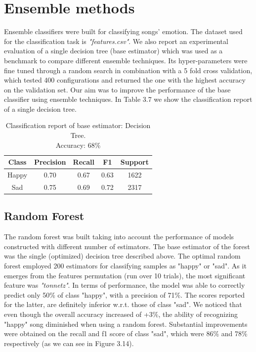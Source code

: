 

\section{Ensemble methods}
Ensemble classifiers were built for classifying songs' emotion. The dataset used for the classification task is \textit{"features.csv"}. 
We also report an experimental evaluation of a single decision tree (base estimator) which was used as a benchmark to compare different ensemble techniques. Its hyper-parameters were fine tuned through a random search in combination with a 5 fold cross validation, which tested 400 configurations and returned the one with the highest accuracy on the validation set. Our aim was to improve the performance of the base classifier using ensemble techniques. In Table 3.7 we show the classification report of a single decision tree. 
 
\begin{table}[!htb]
\centering
\begin{tabular}{ccccc}
\hline
\textbf{Class} & \textbf{Precision} & \textbf{Recall} & \textbf{F1}   & \textbf{Support} \\ \hline
Happy & 0.70      & 0.67   & 0.63 & 1622    \\ \hline
Sad   & 0.75      & 0.69   & 0.72 & 2317    \\
\end{tabular}
\caption{Classification report of base estimator:  Decision Tree.\\ 
Accuracy: 68\%}
\label{Classification report: Decision Tree Ensemble}
\end{table}


\subsection{Random Forest}
The random forest was built taking into account the performance of models constructed with different number of estimators. The base estimator of the forest was the single (optimized) decision tree described above. The optimal random forest employed 200 estimators for classifying samples as "happy" or "sad". As it emerges from the features permutation (run over 10 trials), the most significant feature was \textit{"tonnetz"}. 
In terms of performance, the model was able to correctly predict only 50\% of class "happy", with a precision of 71\%. The scores reported for the latter, are definitely inferior w.r.t. those of class "sad". We noticed that even though the overall accuracy increased of +3\%, the ability of recognizing "happy" song diminished when using a random forest. Substantial improvements were obtained on the recall and f1 score of class "sad", which were 86\% and 78\% respectively (as we can see in Figure 3.14).


